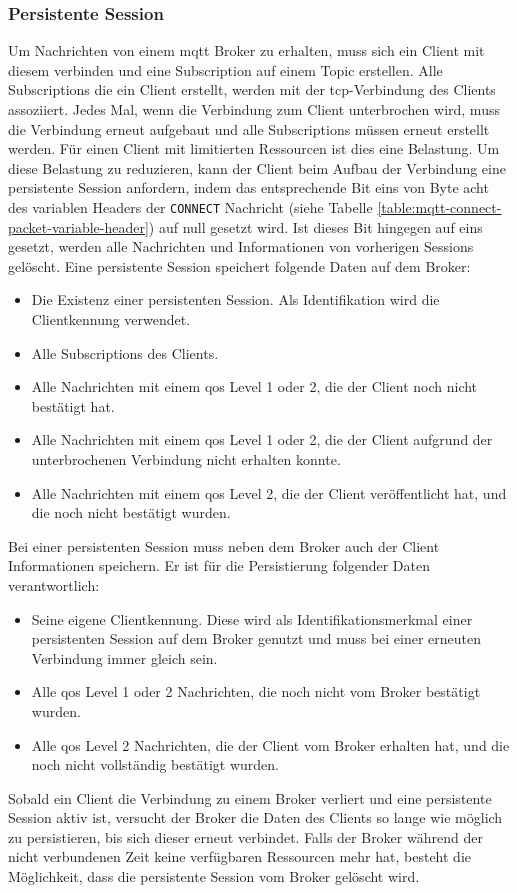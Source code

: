 \subsubsection{Persistente Session} \label{s:persistent-session}
Um Nachrichten von einem \ac{mqtt} Broker zu erhalten, muss sich ein Client mit diesem verbinden und eine Subscription auf einem Topic erstellen. Alle Subscriptions die ein Client erstellt, werden mit der \ac{tcp}-Verbindung des Clients assoziiert.
Jedes Mal, wenn die Verbindung zum Client unterbrochen wird, muss die Verbindung erneut aufgebaut und alle Subscriptions müssen erneut erstellt werden.
Für einen Client mit limitierten Ressourcen ist dies eine Belastung.
Um diese Belastung zu reduzieren, kann der Client beim Aufbau der Verbindung eine persistente Session anfordern, indem das entsprechende Bit eins von Byte acht des variablen Headers der \verb|CONNECT| Nachricht (siehe Tabelle \ref{table:mqtt-connect-packet-variable-header}) auf null gesetzt wird.
Ist dieses Bit hingegen auf eins gesetzt, werden alle Nachrichten und Informationen von vorherigen Sessions gelöscht.
Eine persistente Session speichert folgende Daten auf dem Broker:
\begin{itemize}
    \item Die Existenz einer persistenten Session. Als Identifikation wird die Clientkennung verwendet.
    \item Alle Subscriptions des Clients.
    \item Alle Nachrichten mit einem \ac{qos} Level 1 oder 2, die der Client noch nicht bestätigt hat.
    \item Alle Nachrichten mit einem \ac{qos} Level 1 oder 2, die der Client aufgrund der unterbrochenen Verbindung nicht erhalten konnte.
    \item Alle Nachrichten mit einem \ac{qos} Level 2, die der Client veröffentlicht hat, und die noch nicht bestätigt wurden.
\end{itemize}
Bei einer persistenten Session muss neben dem Broker auch der Client Informationen speichern.
Er ist für die Persistierung folgender Daten verantwortlich:
\begin{itemize}
    \item Seine eigene Clientkennung. Diese wird als Identifikationsmerkmal einer persistenten Session auf dem Broker genutzt und muss bei einer erneuten Verbindung immer gleich sein.
    \item Alle \ac{qos} Level 1 oder 2 Nachrichten, die noch nicht vom Broker bestätigt wurden.
    \item Alle \ac{qos} Level 2 Nachrichten, die der Client vom Broker erhalten hat, und die noch nicht vollständig bestätigt wurden.
\end{itemize}
Sobald ein Client die Verbindung zu einem Broker verliert und eine persistente Session aktiv ist, versucht der Broker die Daten des Clients so lange wie möglich zu persistieren, bis sich dieser erneut verbindet.
Falls der Broker während der nicht verbundenen Zeit keine verfügbaren Ressourcen mehr hat, besteht die Möglichkeit, dass die persistente Session vom Broker gelöscht wird.
\cite{teamPersistentSessionQueuing}

